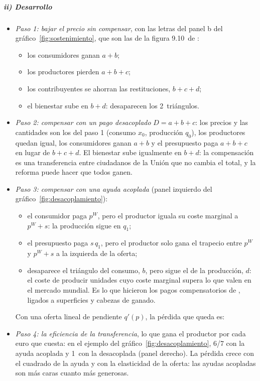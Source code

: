 \documentclass[11pt]{article}
\begin{document}
\subparagraph{ii) Desarrollo}

\begin{itemize}
\item \emph{Paso 1: bajar el precio sin compensar}, con las letras del panel b del gráfico~\ref{fig:sostenimiento}, que son las de la figura 9.10~de \textcite{BaldwinWyplosz2020Economics}:
  \begin{itemize}
  \item los consumidores ganan $a+b$;
  \item los productores pierden $a+b+c$;
  \item los contribuyentes se ahorran las restituciones, $b+c+d$;
  \item el bienestar sube en $b+d$: desaparecen los 2~triángulos.
  \end{itemize}
\item \emph{Paso 2: compensar con un pago desacoplado} $D=a+b+c$: los precios y las cantidades son los del paso 1 (consumo $x_0$, producción $q_0$), los productores quedan igual, los consumidores ganan $a+b$ y el presupuesto paga $a+b+c$ en lugar de $b+c+d$. El bienestar sube igualmente en $b+d$: la compensación es una transferencia entre ciudadanos de la Unión que no cambia el total, y la reforma puede hacer que todos ganen.
\item \emph{Paso 3: compensar con una ayuda acoplada} (panel izquierdo del gráfico~\ref{fig:desacoplamiento}):
  \begin{itemize}
  \item el consumidor paga $p^W$, pero el productor iguala su coste marginal a $p^W+s$: la producción sigue en $q_1$;
  \item el presupuesto paga $s\,q_1$, pero el productor solo gana el trapecio entre $p^W$ y $p^W+s$ a la izquierda de la oferta;
  \item desaparece el triángulo del consumo, $b$, pero sigue el de la producción, $d$: el coste de producir unidades cuyo coste marginal supera lo que valen en el mercado mundial. Es lo que hicieron los pagos compensatorios de , ligados a superficies y cabezas de ganado.
  \end{itemize}
  Con una oferta lineal de pendiente $q'(p)$, la pérdida que queda es:
\item \emph{Paso 4: la eficiencia de la transferencia}, lo que gana el productor por cada euro que cuesta: en el ejemplo del gráfico~\ref{fig:desacoplamiento}, 6/7 con la ayuda acoplada y 1~con la desacoplada (panel derecho). La pérdida crece con el cuadrado de la ayuda y con la elasticidad de la oferta: las ayudas acopladas son más caras cuanto más generosas.
\end{itemize}
\end{document}
